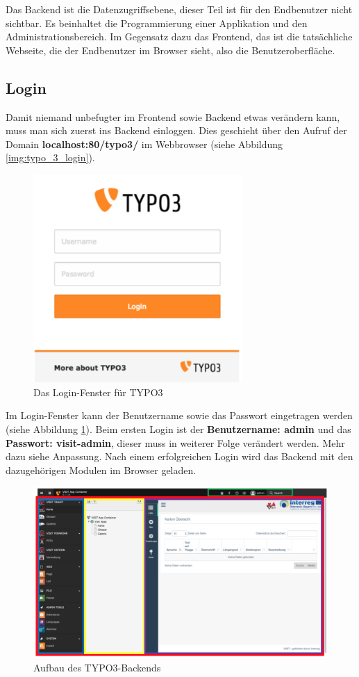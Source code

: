 Das Backend ist die Datenzugriffsebene, dieser Teil ist für den Endbenutzer nicht sichtbar. Es beinhaltet die Programmierung einer Applikation und den Administrationsbereich. Im Gegensatz dazu das Frontend, das ist die tatsächliche Webseite, die der Endbenutzer im Browser sieht, also die Benutzeroberfläche.

\subsection{Login}

Damit niemand unbefugter im Frontend sowie Backend etwas verändern kann, muss man sich zuerst ins Backend einloggen. Dies geschieht über den Aufruf der Domain \textbf{localhost:80/typo3/} im Webbrowser (siehe Abbildung \ref{img:typo_3_login}).

\begin{figure}[ht!]
\centering
\includegraphics[width=8cm]{Figures/paula/typo3/login_TYPO3.png}
\caption{Das Login-Fenster für TYPO3}
\label{img:typo_3_logIn}
\end{figure}

Im Login-Fenster kann der Benutzername sowie das Passwort eingetragen werden (siehe Abbildung \ref{img:typo_3_logIn}). Beim ersten Login ist der \textbf{Benutzername: admin} und das \textbf{Passwort: visit-admin}, dieser muss in weiterer Folge verändert werden. Mehr dazu siehe Anpassung.
Nach einem erfolgreichen Login wird das Backend mit den dazugehörigen Modulen im Browser geladen.

\begin{figure}[ht!]
\centering
\includegraphics[width=12cm]{Figures/paula/typo3/aufbau_TYPO3.png}
\caption{Aufbau des TYPO3-Backends}
\label{img:typo_3_backend}
\end{figure}

